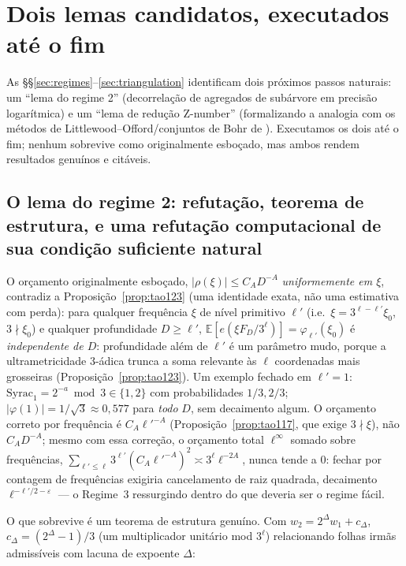 \documentclass[11pt]{article}
\theoremstyle{definition}
\theoremstyle{remark}
\begin{document}
\section{Dois lemas candidatos, executados até o fim}
\label{sec:lemmas}

As \S\S\ref{sec:regimes}--\ref{sec:triangulation} identificam dois
próximos passos naturais: um ``lema do regime 2'' (decorrelação de
agregados de subárvore em precisão logarítmica) e um ``lema de redução
Z-number'' (formalizando a analogia com os métodos de
Littlewood--Offord/conjuntos de Bohr de \cite{Tao2011}). Executamos os
dois até o fim; nenhum sobrevive como originalmente esboçado, mas
ambos rendem resultados genuínos e citáveis.

\subsection{O lema do regime 2: refutação, teorema de estrutura, e uma
refutação computacional de sua condição suficiente natural}

O orçamento originalmente esboçado, $|\rho(\xi)|\le C_A D^{-A}$
\emph{uniformemente em $\xi$}, contradiz a Proposição~\ref{prop:tao123}
(uma identidade exata, não uma estimativa com perda): para qualquer
frequência $\xi$ de nível primitivo $\ell'$ (i.e.\
$\xi=3^{\ell-\ell'}\xi_0$, $3\nmid\xi_0$) e qualquer profundidade
$D\ge\ell'$, $\mathbb{E}[e(\xi F_D/3^\ell)] = \varphi_{\ell'}(\xi_0)$ é
\emph{independente de $D$}: profundidade além de $\ell'$ é um
parâmetro mudo, porque a ultrametricidade $3$-ádica trunca a soma
relevante às $\ell$ coordenadas mais grosseiras
(Proposição~\ref{prop:tao123}). Um exemplo fechado em $\ell'=1$:
$\mathrm{Syrac}_1 = 2^{-a}\bmod 3 \in\{1,2\}$ com probabilidades
$1/3,2/3$; $|\varphi(1)|=1/\sqrt3\approx 0{,}577$ para \emph{todo} $D$,
sem decaimento algum. O orçamento correto por frequência é
$C_A\ell'^{-A}$ (Proposição~\ref{prop:tao117}, que exige
$3\nmid\xi$), não $C_AD^{-A}$; mesmo com essa correção, o orçamento
total $\ell^\infty$ somado sobre frequências, $\sum_{\ell'\le \ell}
3^{\ell'}(C_A\ell'^{-A})^2 \asymp 3^\ell \ell^{-2A}$, nunca tende a
$0$: fechar por contagem de frequências exigiria cancelamento de raiz
quadrada, decaimento $\ell^{-\ell'/2-\varepsilon}$ --- o Regime~3
ressurgindo dentro do que deveria ser o regime fácil.

O que sobrevive é um teorema de estrutura genuíno. Com $w_2 =
2^\Delta w_1 + c_\Delta$, $c_\Delta=(2^\Delta-1)/3$ (um multiplicador
unitário mod $3^\ell$) relacionando folhas irmãs admissíveis com lacuna
de expoente $\Delta$:
\end{document}
